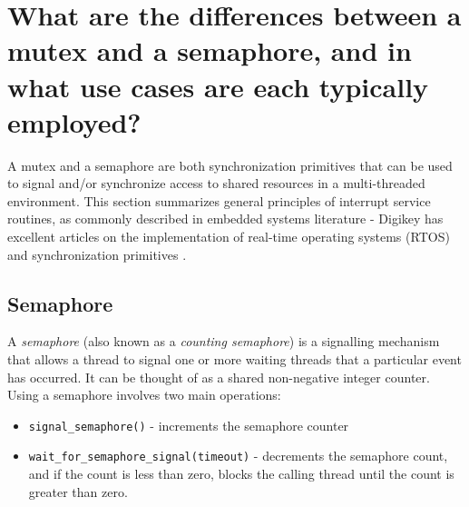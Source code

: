 \documentclass[main.tex]{subfiles}
\begin{document}
\section{What are the differences between a mutex and a semaphore, and in what use cases are each typically employed?}

\spoilerline
\noindent A mutex and a semaphore are both synchronization primitives that can be used to signal and/or synchronize access to shared resources in a multi-threaded environment. This section summarizes general principles of interrupt service routines, as commonly described in embedded systems literature - Digikey has excellent articles on the implementation of real-time operating systems (RTOS) and synchronization primitives \cite{digikey_rtos}.

\subsection{Semaphore}
A \textit{semaphore} (also known as a \textit{counting semaphore}) is a signalling mechanism that allows a thread to signal one or more waiting threads that a particular event has occurred. It can be thought of as a shared non-negative integer counter.
\newline
\newline
Using a semaphore involves two main operations: \begin{itemize}
    \item \texttt{signal\_semaphore()} - increments the semaphore counter
    \item \texttt{wait\_for\_semaphore\_signal(timeout)} - decrements the semaphore count, and if the count is less than zero, blocks the calling thread until the count is greater than zero.
\end{itemize}
\end{document}
